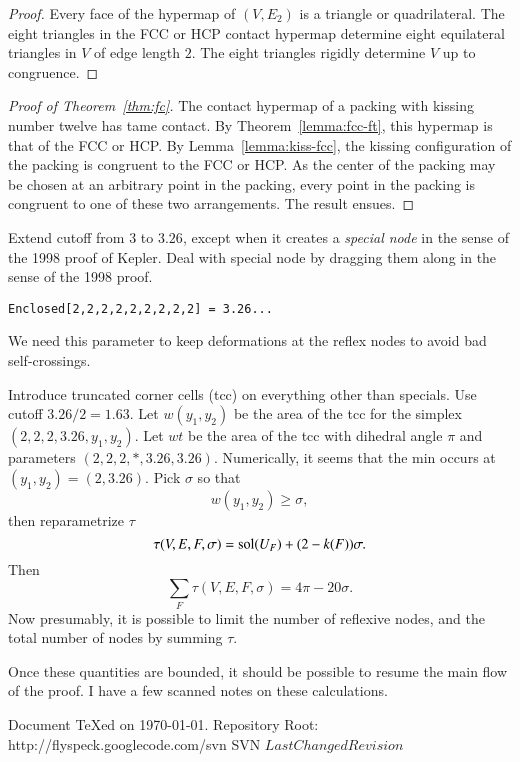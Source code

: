 \documentclass{llncs}
\def\svninfo{{\tt
  filename: turing.tex\hfill\break
  PDF generated from LaTeX sources on \today; \hfill\break
  Repository Root: https://flyspeck.googlecode.com/svn \hfill\break
  SVN $LastChangedRevision$
  }
  }
\def\svninfo{%
  \noindent
  Document TeXed on \today. \hfill\break
  Repository Root: http://flyspeck.googlecode.com/svn \hfill\break
  SVN $LastChangedRevision$\hfill\break
  }
\begin{document}
\begin{proof} Every face of the hypermap of $(V,E_{2})$ is a
  triangle or quadrilateral.  The eight triangles in the FCC or HCP
  contact hypermap determine eight equilateral triangles in $V$ of
  edge length $2$.  The eight triangles rigidly determine $V$ up to
  congruence.
\end{proof}

\begin{proof}[Proof of Theorem~\ref{thm:fc}]  %
  The contact hypermap of a packing with kissing number twelve has tame
  contact.  By Theorem~\ref{lemma:fcc-ft}, this hypermap is that of
  the FCC or HCP.  By Lemma~\ref{lemma:kiss-fcc}, the kissing
  configuration of the packing is congruent to the FCC or HCP.  As the
  center of the packing may be chosen at an arbitrary point in the
  packing, every point in the packing is congruent to one of these two
  arrangements.  The result ensues.
\end{proof}




Extend cutoff from $3$ to $3.26$, except when it creates a
{\it special node} in the sense of the 1998 proof of Kepler.
Deal with special node by dragging them along in the sense of the 1998 proof.


\begin{verbatim}
Enclosed[2,2,2,2,2,2,2,2,2] = 3.26...
\end{verbatim}
We need this parameter to keep deformations at the reflex nodes to avoid
bad self-crossings.

Introduce truncated corner cells (tcc) on everything other than specials.
Use cutoff $3.26/2 = 1.63$.  Let $w(y_1,y_2)$ be the area of the tcc
for the simplex $(2,2,2,3.26,y_1,y_2)$.  Let $wt$ be the area of the tcc
with dihedral angle $\pi$ and parameters $(2,2,2,*,3.26,3.26)$.
Numerically, it seems that the min
occurs at $(y_1,y_2)=(2,3.26)$.  Pick $\sigma$ so that 
\[
w(y_1,y_2)\ge \sigma,
\]
then 
reparametrize $\tau$ 
\[
\tau(V,E,F,\sigma) = \operatorname{sol}(U_F) + (2-k(F)) \sigma.
\]
Then
\[
\sum_F\tau(V,E,F,\sigma) = 4\pi - 20\sigma.
\]
Now presumably, it is possible to limit the number of reflexive nodes,
and the total number of nodes by summing $\tau$.

Once these quantities are bounded, it should be possible to resume the
main flow of the proof.  I have a few scanned notes on these calculations.




\raggedright



\newpage
\bigskip
\noindent
\svninfo
\smallskip

\noindent
\endnote
\end{document}
